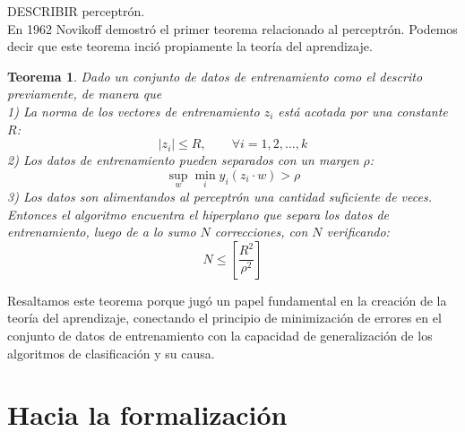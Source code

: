 \documentclass{article}
\newtheorem*{teorema}{Teorema}
\begin{document}
DESCRIBIR perceptrón.\\

En 1962 Novikoff demostró el primer teorema relacionado al perceptrón. Podemos decir que este teorema inció propiamente la teoría del aprendizaje.

\begin{teorema}
Dado un conjunto de datos de entrenamiento como el descrito previamente, de manera que\\
1) La norma de los vectores de entrenamiento $z_i$ está acotada por una constante $R$:
$$
|z_i| \leq R, \qquad \forall i=1,2,\dots,k
$$
2) Los datos de entrenamiento pueden separados con un margen $\rho$:
$$
\sup_{w} \min_{i} y_i(z_i\cdot w) > \rho
$$
3) Los datos son alimentandos al perceptrón una cantidad \textit{suficiente} de veces.\\

Entonces el algoritmo encuentra el hiperplano que separa los datos de entrenamiento, luego de a lo
sumo $N$ correcciones, con $N$ verificando:
$$
N \leq \left [ \frac{R^2}{\rho^2}\right ]
$$

\end{teorema}

Resaltamos este teorema porque jugó un papel fundamental en la creación de la teoría del aprendizaje, conectando el
principio de minimización de errores en el conjunto de datos de entrenamiento con la capacidad de generalización
de los algoritmos de clasificación y su causa.

\section{Hacia la formalización}
\end{document}
